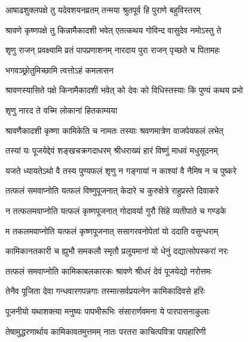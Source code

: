 \twolineshloka
{आषाढशुक्लपक्षे तु यदेवशयनव्रतम्}
{तन्मया श्रुतपूर्व हि पुराणे बहुविस्तरम्} %

\twolineshloka
{श्रावणे कृष्णपक्षे तु किन्नामैकादशी भवेत्}
{एतत्कथय गोविन्द वासुदेव नमोऽस्तु ते} %


\twolineshloka
{शृणु राजन् प्रवक्ष्यामि व्रतं पापप्रणाशनम्}
{नारदाय पुरा राजन् पृच्छते च पितामहः} %



\onelineshloka
{भगवञ्छ्रोतुमिच्छामि त्वत्तोऽहं कमलासन} %

\twolineshloka
{श्रावणस्यासिते पक्षे किनामैकादशी भवेत्}
{को देवः को विधिस्तस्याः किं पुण्यं कथय प्रभो} %



\onelineshloka
{शृणु नारद ते वच्मि लोकानां हितकाम्यया} %

\twolineshloka
{श्रावणैकादशी कृष्णा कामिकेति च नामतः}
{तस्याः श्रवणमात्रेण वाजपेयफलं लभेत्} %

\twolineshloka
{तस्यां यः पूजयेद्देवं शङ्खचक्रगदाधरम्}
{श्रीधराख्यं हारं विष्णुं माधवं मधुसूदनम्} %

\twolineshloka
{यजते ध्यायतेऽथो वै तस्य पुण्यफलं शृणु}
{न गङ्गायां न काश्यां वै नैमिष न च पुष्करे} %

\twolineshloka
{तत्फलं समवाप्नोति यत्फलं विष्णुपूजनात्}
{केदारे च कुरुक्षेत्रे राहुप्रस्ते दिवाकरे} %

\twolineshloka
{न तत्फलमवाप्नोति यत्फलं कृष्णपूजनात्}
{गोदावर्या गुरौ सिंहे व्यतीपाते च गण्डके} %

\twolineshloka
{म तकलमवाप्नोति यत्फलं कृष्णपूजनात्}
{ससागरवनोपेतां यो ददाति वसुन्धराम्} %

\twolineshloka
{कामिकानतकारी च ह्युभौ समकलौ स्मृतौ}
{प्रलूयमानां यो धेनुं दद्यात्सोपस्करां नरः} %

\twolineshloka
{तत्फलं समवाप्नोति कामिकाबलकारकः}
{श्रावणे श्रीधरं देवं पूजयेद्यो नरोत्तमः} %

\twolineshloka
{तेनैव पूजिता देवा गन्धवारगपन्नगाः}
{तस्मात्सर्वप्रयत्नेन कामिकादिवसे हरिः} %

\twolineshloka
{पूजनीयो यथाशक्त्या मनुष्यः पापभीरूभिः}
{संसारार्णवमना ये पारपासनाकुलाः} %

\twolineshloka
{तेषामुद्धरणार्थाय कामिकावतमुत्तमम्}
{नातः परतरा काचित्पवित्रा पापहारिणी} %

